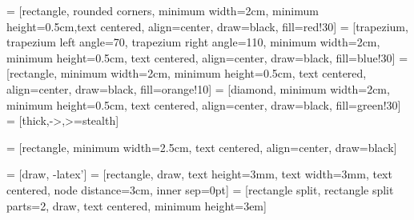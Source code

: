 \usepackage{bytefield}

\usepackage[os=win]{menukeys}

\usepackage{minted}
\usepackage[linecolor=black, topline=true, bottomline=true,
leftline=false, rightline=false,
backgroundcolor=yellow!20!white]{mdframed}




\def\smbwd{2cm}        
 = [rectangle, rounded corners, minimum width=\smbwd,
    minimum height=0.5cm,text centered, align=center, draw=black, fill=red!30]
 = [trapezium, trapezium left angle=70, trapezium right angle=110, minimum width=\smbwd,
    minimum height=0.5cm, text centered, align=center, draw=black, fill=blue!30]
 = [rectangle, minimum width=\smbwd,
    minimum height=0.5cm, text centered, align=center, draw=black, fill=orange!10]
 = [diamond, minimum width=\smbwd,
    minimum height=0.5cm, text centered, align=center, draw=black, fill=green!30]
 = [thick,->,>=stealth]

 = [rectangle, minimum width=2.5cm, text centered,
align=center, draw=black]

  = [draw, -latex']
 = [rectangle, draw, text height=3mm, text width=3mm, text centered, node distance=3cm, inner sep=0pt]
 = [rectangle split, rectangle split parts=2, draw,
text centered, minimum height=3em]

